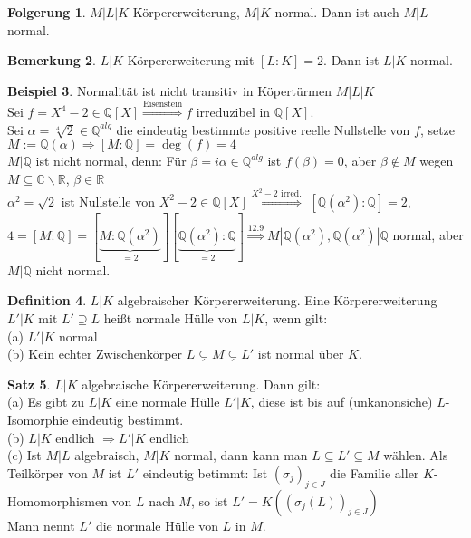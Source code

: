 \documentclass[10pt,a4paper,numbers=endperiod]{scrreprt}
\theoremstyle{definition}
\newtheorem{satz}{Satz}[section]
\newtheorem{defi}[satz]{Definition}
\newtheorem{bem}[satz]{Bemerkung}
\newtheorem{bsp}[satz]{Beispiel}
\newtheorem{folg}[satz]{Folgerung}
\def\QQ{{\mathbb Q}}
\def\CC{{\mathbb C}}
\def\RR{{\mathbb R}}
\begin{document}
\begin{folg}
	$M|L|K$ Körpererweiterung, $M|K$ normal. Dann ist auch $M|L$ normal.
\end{folg}

\begin{bem}
	$L|K$ Körpererweiterung mit $[L:K] = 2$. Dann ist $L|K$ normal.
\end{bem}

\begin{bsp}
	Normalität ist nicht transitiv in Köpertürmen $M|L|K$\\
	Sei $f = X^4-2 \in \QQ[X] \overset{\text{Eisenstein}}{\Rightarrow} f$ irreduzibel in $\QQ[X]$.\\
	Sei $\alpha = \sqrt[4]{2} \in \QQ^{alg}$ die eindeutig bestimmte positive reelle Nullstelle von $f$, setze $M := \QQ(\alpha) \Rightarrow [M: \QQ] = \deg(f) = 4$\\
	$M|\QQ$ ist nicht normal, denn: Für $\beta = i \alpha \in \QQ^{alg}$ ist $f(\beta) = 0$, aber $\beta \notin M$ wegen $M \subseteq \CC \backslash \RR$, $\beta \in \RR$\\
	$\alpha^2 = \sqrt{2}$ ist Nullstelle von $X^2 - 2 \in \QQ[X] \overset{X^2-2 \text{ irred.}}{\Longrightarrow}$ $[\QQ(\alpha^2): \QQ] = 2$,\\
	$4 = [M: \QQ] = [\underbrace{M:\QQ(\alpha^2)}_{=2}] [\underbrace{\QQ(\alpha^2): \QQ}_{= 2}] \overset{12.9}{\Rightarrow} M|\QQ(\alpha^2), \QQ(\alpha^2)|\QQ$ normal, aber $M|\QQ$ nicht normal.
\end{bsp}

\begin{defi}
	$L|K$ algebraischer Körpererweiterung. Eine Körpererweiterung $L'|K$ mit $L' \supseteq L$ heißt normale Hülle von $L|K$, wenn gilt:\\
	(a) $L'|K$ normal\\
	(b) Kein echter Zwischenkörper $L \subsetneq M \subsetneq L'$ ist normal über $K$.
\end{defi}

\begin{satz}
	$L|K$ algebraische Körpererweiterung. Dann gilt:\\
	(a) Es gibt zu $L|K$ eine normale Hülle $L'|K$, diese ist bis auf (unkanonsiche) $L$-Isomorphie eindeutig bestimmt.\\
	(b) $L|K$ endlich $\Rightarrow L'|K$ endlich\\
	(c) Ist $M|L$ algebraisch, $M|K$ normal, dann kann man $L \subseteq L' \subseteq M$ wählen. Als Teilkörper von $M$ ist $L'$ eindeutig betimmt: Ist $(\sigma_j)_{j \in J}$ die Familie aller $K$-Homomorphismen von $L$ nach $M$, so ist $L' = K((\sigma_j(L))_{j \in J})$\\
	Mann nennt $L'$ die normale Hülle von $L$ in $M$.
\end{satz}
\end{document}
